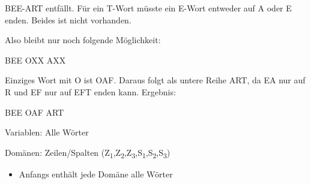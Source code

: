\documentclass[ngerman]{fbi-aufgabenblatt}
\begin{document}
BEE-ART entfällt. Für ein T-Wort müsste ein E-Wort entweder auf A oder E enden. Beides ist nicht vorhanden.

\newpage

Also bleibt nur noch folgende Möglichkeit:

BEE \newline
OXX \newline
AXX

Einziges Wort mit O ist OAF. Daraus folgt als untere Reihe ART, da EA nur auf R und EF nur auf EFT enden kann. Ergebnis:

BEE \newline
OAF \newline
ART

\newpage


Variablen: Alle Wörter

Domänen: Zeilen/Spalten (Z\textsubscript{1},Z\textsubscript{2},Z\textsubscript{3},S\textsubscript{1},S\textsubscript{2},S\textsubscript{3})
\begin{itemize}
	\item Anfangs enthält jede Domäne alle Wörter
\end{itemize}
	
\end{document}
